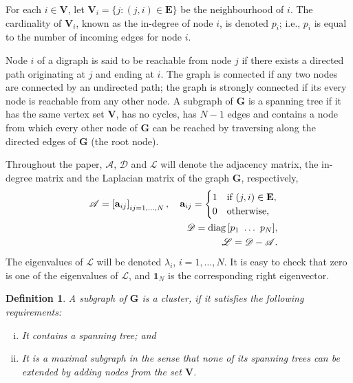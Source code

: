 \documentclass[a4paper,10pt,conference]{ieeeconf}
\newtheorem{definition}{Definition}
\begin{document}
For each $i\in \mathbf{V}$, let $\mathbf{V}_i=\{j:(j,i)\in \mathbf{E}\}$
be the neighbourhood of $i$.  The cardinality of
$\mathbf{V}_i$, known as the in-degree of node $i$, is denoted $p_i$; i.e.,
$p_i$ is equal to the number of incoming edges for node $i$. 

Node $i$ of a digraph is said to be reachable from node $j$ if there exists
a directed path originating at $j$ and ending at $i$. The graph is
connected if any two nodes are connected by an undirected path; the graph is
strongly connected if its every node is reachable from any other node. A
subgraph of $\mathbf{G}$ is a spanning tree if it has the same vertex set
$\mathbf{V}$, has no cycles, has $N-1$
edges and 
contains a node from which every other node of $\mathbf{G}$ can be reached
by traversing along the directed edges of $\mathbf{G}$ (the root node). 

Throughout the paper, $\mathcal{A}$, $\mathcal{D}$ and $\mathcal{L}$ will denote
the adjacency matrix, the in-degree matrix and the Laplacian matrix of the
graph $\mathbf{G}$, respectively,
\begin{eqnarray*}
  && \mathcal{A}=\left[\mathbf{a}_{ij}\right]_{ij=1,\ldots, N}, \quad
  \mathbf{a}_{ij}= \begin{cases}1 & \text{if $(j,i)\in\mathbf{E}$}, \\
                                0 & \text{otherwise},
                              \end{cases} \\
  && \mathcal{D}=\mathop{\mathrm{diag}}\nolimits{[p_1~ \ldots~ p_N]}, \\
  && \mathcal{L}=\mathcal{D}-\mathcal{A}.
\end{eqnarray*}
The eigenvalues of $\mathcal{L}$ will be denoted $\lambda_i$,
$i=1,\ldots,N$. It is easy to check that zero is one of the eigenvalues of
$\mathcal{L}$, and $\mathbf{1}_N$ is the corresponding right eigenvector. 





\begin{definition}\label{cluster}
A subgraph of $\mathbf{G}$ is a \emph{cluster}, if it satisfies the following
requirements:
\begin{enumerate}[(i)]
\item
It contains a spanning tree; and
\item   
It is a maximal subgraph in the sense that none of its spanning trees can
be extended by adding nodes from the set $\mathbf{V}$. 
\end{enumerate}   
\end{definition}
\end{document}
